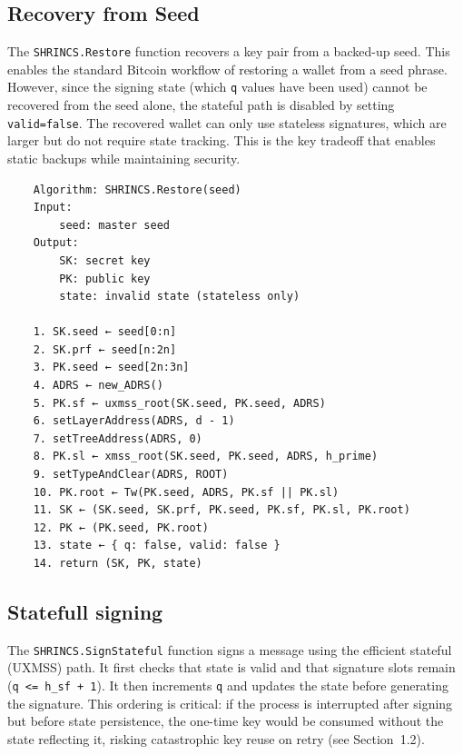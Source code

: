 \subsection{Recovery from Seed}
The \texttt{SHRINCS.Restore} function recovers a key pair from a backed-up seed. This enables the standard Bitcoin workflow of restoring a wallet from a seed phrase. However, since the signing state (which \texttt{q} values have been used) cannot be recovered from the seed alone, the stateful path is disabled by setting \texttt{valid=false}. The recovered wallet can only use stateless signatures, which are larger but do not require state tracking. This is the key tradeoff that enables static backups while maintaining security.
\begin{verbatim}
    Algorithm: SHRINCS.Restore(seed)
    Input:
        seed: master seed
    Output:
        SK: secret key
        PK: public key
        state: invalid state (stateless only)

    1. SK.seed ← seed[0:n]
    2. SK.prf ← seed[n:2n]
    3. PK.seed ← seed[2n:3n]
    4. ADRS ← new_ADRS()
    5. PK.sf ← uxmss_root(SK.seed, PK.seed, ADRS)
    6. setLayerAddress(ADRS, d - 1)
    7. setTreeAddress(ADRS, 0)
    8. PK.sl ← xmss_root(SK.seed, PK.seed, ADRS, h_prime)
    9. setTypeAndClear(ADRS, ROOT)
    10. PK.root ← Tw(PK.seed, ADRS, PK.sf || PK.sl)
    11. SK ← (SK.seed, SK.prf, PK.seed, PK.sf, PK.sl, PK.root)
    12. PK ← (PK.seed, PK.root)
    13. state ← { q: false, valid: false }
    14. return (SK, PK, state)
\end{verbatim}

\subsection{Statefull signing}
The \texttt{SHRINCS.SignStateful} function signs a message using the efficient stateful (UXMSS) path. It first checks that state is valid and that signature slots remain (\texttt{q <= h\_sf + 1}). It then increments \texttt{q} and updates the state before generating the signature. This ordering is critical: if the process is interrupted after signing but before state persistence, the one-time key would be consumed without the state reflecting it, risking catastrophic key reuse on retry (see Section~1.2).

